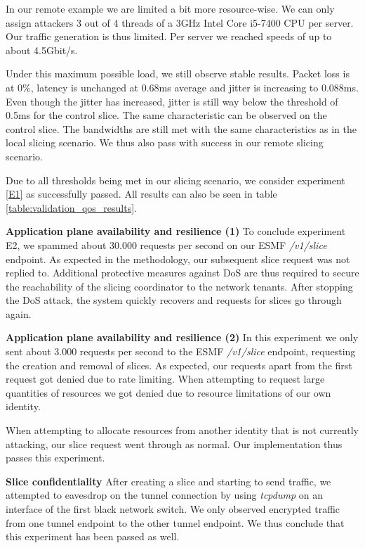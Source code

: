 \begin{description}[style=multiline, labelwidth=0.7cm]
    In our remote example we are limited a bit more resource-wise. We can only assign attackers 3 out of 4 threads of a 3GHz Intel Core i5-7400 CPU per server. Our traffic generation is thus limited. Per server we reached speeds of up to about 4.5Gbit/s.

    Under this maximum possible load, we still observe stable results. Packet loss is at 0\%, latency is unchanged at 0.68ms average and jitter is increasing to 0.088ms. Even though the jitter has increased, jitter is still way below the threshold of 0.5ms for the control slice. The same characteristic can be observed on the control slice. The bandwidths are still met with the same characteristics as in the local slicing scenario. We thus also pass with success in our remote slicing scenario.

    Due to all thresholds being met in our slicing scenario, we consider experiment \ref{E1} as successfully passed. All results can also be seen in table \ref{table:validation_qos_results}.

   \item[\ref{E2}] \textbf{Application plane availability and resilience (1)} To conclude experiment E2, we spammed about 30.000 requests per second on our ESMF \textit{/v1/slice} endpoint. As expected in the methodology, our subsequent slice request was not replied to. Additional protective measures against DoS are thus required to secure the reachability of the slicing coordinator to the network tenants. After stopping the DoS attack, the system quickly recovers and requests for slices go through again.

   \item[\ref{E3}] \textbf{Application plane availability and resilience (2)} In this experiment we only sent about 3.000 requests per second to the ESMF \textit{/v1/slice} endpoint, requesting the creation and removal of slices. As expected, our requests apart from the first request got denied due to rate limiting. When attempting to request large quantities of resources we got denied due to resource limitations of our own identity.

   When attempting to allocate resources from another identity that is not currently attacking, our slice request went through as normal. Our implementation thus passes this experiment.

   \item[\ref{E4}] \textbf{Slice confidentiality} After creating a slice and starting to send traffic, we attempted to eavesdrop on the tunnel connection by using \textit{tcpdump} on an interface of the first black network switch. We only observed encrypted traffic from one tunnel endpoint to the other tunnel endpoint. We thus conclude that this experiment has been passed as well.
\end{description}

